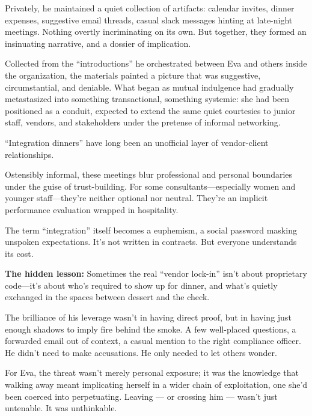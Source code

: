 Privately, he maintained a quiet collection of artifacts: calendar invites, dinner expenses, suggestive email threads, casual slack messages hinting at late-night meetings. Nothing overtly incriminating on its own. But together, they formed an insinuating narrative, and a dossier of implication.

Collected from the “introductions” he orchestrated between Eva and others inside the organization, the materials painted a picture that was suggestive, circumstantial, and deniable. What began as mutual indulgence had gradually metastasized into something transactional, something systemic: she had been positioned as a conduit, expected to extend the same quiet courtesies to junior staff, vendors, and stakeholders under the pretense of informal networking.

\begin{tcolorbox}[title=Behind the Curtain: The Integration Meeting, colback=gray!5, colframe=black, fonttitle=\bfseries]
  ``Integration dinners'' have long been an unofficial layer of vendor-client relationships.

  \medskip

  Ostensibly informal, these meetings blur professional and personal boundaries under the guise of trust-building. For some consultants—especially women and younger staff—they’re neither optional nor neutral. They’re an implicit performance evaluation wrapped in hospitality.

  \medskip

  The term ``integration'' itself becomes a euphemism, a social password masking unspoken expectations. It’s not written in contracts. But everyone understands its cost.

  \medskip

  \textbf{The hidden lesson:} Sometimes the real ``vendor lock-in'' isn’t about proprietary code—it’s about who’s required to show up for dinner, and what’s quietly exchanged in the spaces between dessert and the check.
\end{tcolorbox}

The brilliance of his leverage wasn’t in having direct proof, but in having just enough shadows to imply fire behind the smoke. A few well-placed questions, a forwarded email out of context, a casual mention to the right compliance officer. He didn’t need to make accusations. He only needed to let others wonder.

For Eva, the threat wasn’t merely personal exposure; it was the knowledge that walking away meant implicating herself in a wider chain of exploitation, one she’d been coerced into perpetuating. Leaving --- or crossing him --- wasn’t just untenable. It was unthinkable.

